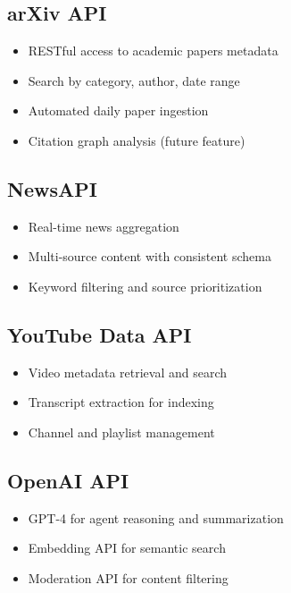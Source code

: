 \documentclass[12pt,a4paper]{report}
\begin{document}
\subsection{arXiv API}

\begin{itemize}[label=\textbullet]
    \item RESTful access to academic papers metadata
    \item Search by category, author, date range
    \item Automated daily paper ingestion
    \item Citation graph analysis (future feature)
\end{itemize}

\subsection{NewsAPI}

\begin{itemize}[label=\textbullet]
    \item Real-time news aggregation
    \item Multi-source content with consistent schema
    \item Keyword filtering and source prioritization
\end{itemize}

\subsection{YouTube Data API}

\begin{itemize}[label=\textbullet]
    \item Video metadata retrieval and search
    \item Transcript extraction for indexing
    \item Channel and playlist management
\end{itemize}

\subsection{OpenAI API}

\begin{itemize}[label=\textbullet]
    \item GPT-4 for agent reasoning and summarization
    \item Embedding API for semantic search
    \item Moderation API for content filtering
\end{itemize}
\end{document}
